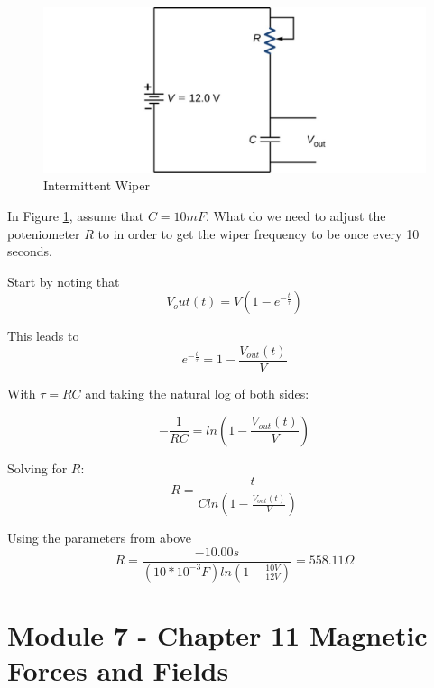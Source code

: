 \documentclass[14pt]{memoir}
\begin{document}
\begin{figure}[H]
\begin{center}
\includegraphics[scale=0.50]{fig/fig_10_iw.jpg}
\caption{Intermittent Wiper}
\label{fig:11_iw}
\end{center}
\end{figure}

In Figure \ref{fig:11_iw}, assume that $C = 10mF$. What do we need to adjust the poteniometer $R$ to in order to get the wiper frequency to be once every 10 seconds. 

Start by noting that 
\begin{equation}
V_out(t) = V(1 - e^{-\frac{t}{\tau}})
\end{equation}

This leads to 
\begin{equation}
e^{-\frac{t}{\tau}} = 1 -\frac{V_{out}(t)}{V}
\end{equation}

With $\tau = RC$ and taking the natural log of both sides:

\begin{equation}
-\frac{1}{RC} = ln(1 - \frac{V_{out}(t)}{V})
\end{equation}

Solving for $R$:
\begin{equation}
R = \frac{-t}{C ln(1 - \frac{V_{out}(t)}{V})}
\end{equation}

Using the parameters from above
\begin{equation}
R = \frac{- 10.00 s}{(10*10^{-3}F) ln(1 - \frac{10 V}{12 V})} = 558.11 \Omega
\end{equation}



\chapter{Module 7 - Chapter 11 Magnetic Forces and Fields}
\end{document}
